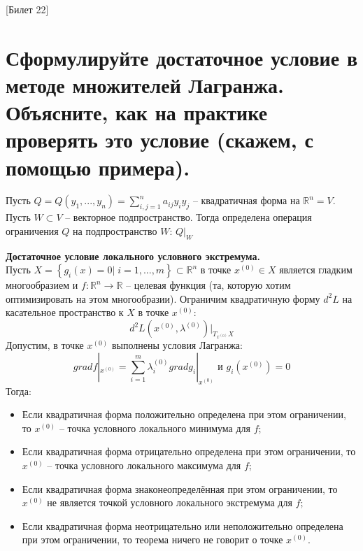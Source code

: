 [Билет 22]

\section{Сформулируйте достаточное условие в методе множителей Лагранжа. Объясните, как на практике
проверять это условие (скажем, с помощью примера).}
\begin{remark}
    Пусть $Q = Q(y_1, ..., y_n) = \sum\limits_{i, j = 1}^n a_{ij} y_i y_j$ -- квадратичная форма
    на $\mathbb{R}^n = V$. Пусть $W \subset V$ -- векторное подпространство. Тогда определена операция ограничения $Q$
    на подпространство $W$: $Q|_W$
\end{remark}

\begin{theorem}{\textbf{Достаточное условие локального условного экстремума.}}\\
    Пусть $X = \left\{g_i(x) = 0 | \; i = 1,..., m\right\} \subset \mathbb{R}^n$ в точке $x^{(0)} \in X$ является гладким многообразием и
    $f: \mathbb{R}^n \to \mathbb{R}$ -- целевая функция (та, которую хотим оптимизировать на этом многообразии).
    Ограничим квадратичную форму $d^2 L$ на касательное пространство к $X$ в точке $x^{(0)}$:
    $$d^2 L(x^{(0)}, \lambda^{(0)})|_{T_{x^{(0)}}X}$$
    Допустим, в точке $x^{(0)}$ выполнены условия Лагранжа:
    $$gradf|_{x^{(0)}} = \sum\limits_{i = 1}^m \lambda^{(0)}_i gradg_i|_{x^{(0)}} \text{ и } g_{i}(x^{(0)}) = 0$$
    Тогда:
    \begin{itemize}
        \item Если квадратичная форма положительно определена при этом ограничении, то $x^{(0)}$ -- точка условного локального минимума для $f$;
        \item Если квадратичная форма отрицательно определена при этом ограничении, то $x^{(0)}$ -- точка условного локального максимума для $f$;
        \item Если квадратичная форма знаконеопределённая при этом ограничении, то $x^{(0)}$ не является точкой условного локального экстремума для $f$;
        \item Если квадратичная форма неотрицательно или неположительно определена при этом ограничении, то теорема ничего не говорит о точке $x^{(0)}$.
    \end{itemize}
\end{theorem}


